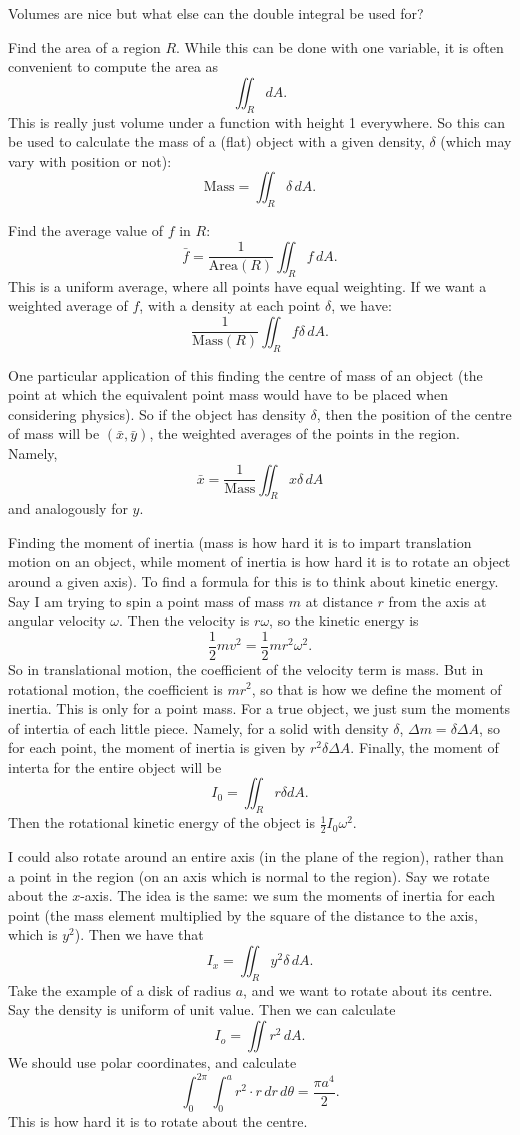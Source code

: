 Volumes are nice but what else can the double integral be used for?
\bit
\item Find the area of a region $R$. While this can be done with one variable, it is often convenient to compute the area as 
\[ \iint_R dA. \]
This is really just volume under a function with height 1 everywhere. So this can be used to calculate the mass of a (flat) object with a given density, $\delta$ (which may vary with position or not):
\[ \mathrm{Mass} = \iint_R \delta\, dA. \]
\item Find the average value of $f$ in $R$:
\[ \bar{f} = \frac 1{\mathrm{Area}(R)}\iint_R f\,dA. \]
This is a uniform average, where all points have equal weighting. If we want a weighted average of $f$, with a density at each point $\delta$, we have:
\[ \frac 1{\mathrm{Mass}(R)}\iint_R f\delta\,dA. \]
\bit
\item One particular application of this finding the centre of mass of an object (the point at which the equivalent point mass would have to be placed when considering physics). So if the object has density $\delta$, then the position of the centre of mass will be $(\bar{x},\bar{y})$, the weighted averages of the points in the region. Namely,
\[ \bar{x} = \frac 1{\mathrm{Mass}}\iint_R x\delta\,dA \]
and analogously for $y$.
\eit
\item Finding the moment of inertia (mass is how hard it is to impart translation motion on an object, while moment of inertia is how hard it is to rotate an object around a given axis). To find a formula for this is to think about kinetic energy. Say I am trying to spin a point mass of mass $m$ at distance $r$ from the axis at angular velocity $\omega$. Then the velocity is $r\omega$, so the kinetic energy is 
\[ \frac 12 mv^2 = \frac 12 mr^2\omega^2. \]
So in translational motion, the coefficient of the velocity term is mass. But in rotational motion, the coefficient is $mr^2$, so that is how we define the moment of inertia. This is only for a point mass. For a true object, we just sum the moments of intertia of each little piece. Namely, for a solid with density $\delta$, $\Delta m = \delta \Delta A$, so for each point, the moment of inertia is given by $r^2\delta\Delta A$. Finally, the moment of interta for the entire object will be
\[ I_0 = \iint_R r\delta dA. \]
Then the rotational kinetic energy of the object is $\frac 12 I_0\omega^2$.

I could also rotate around an entire axis (in the plane of the region), rather than a point in the region (on an axis which is normal to the region). Say we rotate about the $x$-axis. The idea is the same: we sum the moments of inertia for each point (the mass element multiplied by the square of the distance to the axis, which is $y^2$). Then we have that
\[ I_x = \iint_R y^2 \delta\,dA. \] 
\bex
Take the example of a disk of radius $a$, and we want to rotate about its centre. Say the density is uniform of unit value. Then we can calculate
\[ I_o = \iint r^2\,dA. \]
We should use polar coordinates, and calculate
\[ \int_0^{2\pi} \int_0^a r^2\cdot r\,dr\,d\theta = \frac{\pi a^4}2. \]
This is how hard it is to rotate about the centre.


